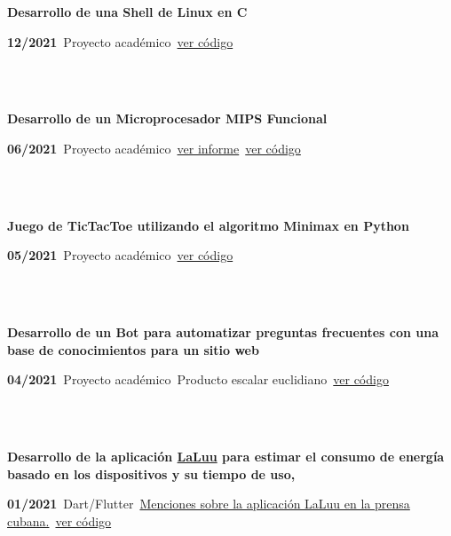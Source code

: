 \documentclass{article}
\begin{document}
\begin{minipage}{0.8\textwidth}
    \parbox{0.8\linewidth}{\textbf{Desarrollo de una Shell de Linux en C}} \hfill \textbf{12/2021}\
    Proyecto académico\
    \href{https://github.com/geeksLabTech/SO_Shell}{ver código}\
    \end{minipage} \hfill {}\\\\
    \begin{minipage}{0.8\textwidth}
    \parbox{0.8\linewidth}{\textbf{Desarrollo de un Microprocesador MIPS Funcional}} \hfill \textbf{06/2021}\
    Proyecto académico\
    \href{https://github.com/JavierOramas/MIPS-Micro/blob/master/informe.pdf}{ver informe}\
    \href{https://github.com/JavierOramas/MIPS-Micro}{ver código}\
    \end{minipage} \hfill {}\\\\
    \begin{minipage}{0.8\textwidth}
    \parbox{0.8\linewidth}{\textbf{Juego de TicTacToe utilizando el algoritmo Minimax en Python}} \hfill \textbf{05/2021}\
    Proyecto académico\
    \href{https://github.com/JavierOramas/TicTacToe_AI}{ver código}\
    \end{minipage} \hfill {}\\\\
    \begin{minipage}{0.8\textwidth}
    \parbox{0.8\linewidth}{\textbf{Desarrollo de un Bot para automatizar preguntas frecuentes con una base de conocimientos para un sitio web}} \hfill \textbf{04/2021}\
    Proyecto académico\
    Producto escalar euclidiano\
    \href{https://github.com/JavierOramas/FAQ-Chat-Bot-Nous}{ver código}\
    \end{minipage} \hfill {}\\\\
    \begin{minipage}{0.8\textwidth}
    \parbox{0.8\linewidth}{\textbf{Desarrollo de la aplicación \hyperref[sec:laluu]{LaLuu} para estimar el consumo de energía basado en los dispositivos y su tiempo de uso,}} \hfill \textbf{01/2021}\
    Dart/Flutter\
    \hyperref[sec:laluu_press]{Menciones sobre la aplicación LaLuu en la prensa cubana.}\
    \href{https://github.com/geeksLabTech/LaLuu}{ver código}\
    \end{minipage} \hfill {}\\\\
\end{document}
